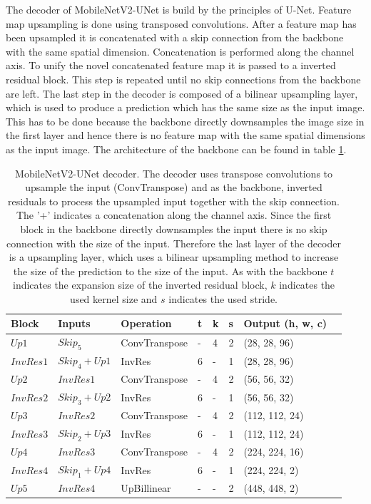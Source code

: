 The decoder of MobileNetV2-UNet is build by the principles of U-Net\cite{unet}.
Feature map upsampling is done using transposed convolutions.
After a feature map has been upsampled it is concatenated with a skip connection from the backbone with the same spatial dimension.
Concatenation is performed along the channel axis.
To unify the novel concatenated feature map it is passed to a inverted residual block.
This step is repeated until no skip connections from the backbone are left.
The last step in the decoder is composed of a bilinear upsampling layer, which is used to produce a prediction which has the same size as the input image.
This has to be done because the backbone directly downsamples the image size in the first layer and hence there is no feature map with the same spatial dimensions as the input image.
The architecture of the backbone can be found in table \ref{tab:mobilenetv2_decoder}.

\begin{table} %
\begin{center}

\begin{tabular}{l|l|l|l|l|l|l|l}
\textbf{Block} & \textbf{Inputs} & \textbf{Operation} & \textbf{t} & \textbf{k} & \textbf{s} & \textbf{Output (h, w, c)}\\
\hline
$Up1$     & $Skip_5$        & ConvTranspose & - & 4 & 2 & (28, 28, 96) \\
$InvRes1$ & $Skip_4 + Up1$  & InvRes        & 6 & - & 1 & (28, 28, 96) \\
$Up2$     & $InvRes1$       & ConvTranspose & - & 4 & 2 & (56, 56, 32) \\
$InvRes2$ & $Skip_3 + Up2$  & InvRes        & 6 & - & 1 & (56, 56, 32) \\
$Up3$     & $InvRes2$       & ConvTranspose & - & 4 & 2 & (112, 112, 24) \\
$InvRes3$ & $Skip_2 + Up3$  & InvRes        & 6 & - & 1 & (112, 112, 24) \\
$Up4$     & $InvRes3$       & ConvTranspose & - & 4 & 2 & (224, 224, 16) \\
$InvRes4$ & $Skip_1 + Up4$  & InvRes        & 6 & - & 1 & (224, 224, 2) \\
$Up5$     & $InvRes4$       & UpBillinear   & - & - & 2 & (448, 448, 2) \\
\end{tabular}

\caption{MobileNetV2-UNet decoder. The decoder uses transpose convolutions to upsample the input (ConvTranspose) and as the backbone, inverted residuals to process the upsampled input together with the skip connection. The '+' indicates a concatenation along the channel axis. Since the first block in the backbone directly downsamples the input there is no skip connection with the size of the input. Therefore the last layer of the decoder is a upsampling layer, which uses a bilinear upsampling method to increase the size of the prediction to the size of the input. As with the backbone $t$ indicates the expansion size of the inverted residual block, $k$ indicates the used kernel size and $s$ indicates the used stride.}
\label{tab:mobilenetv2_decoder}
\end{center}
\end{table}
